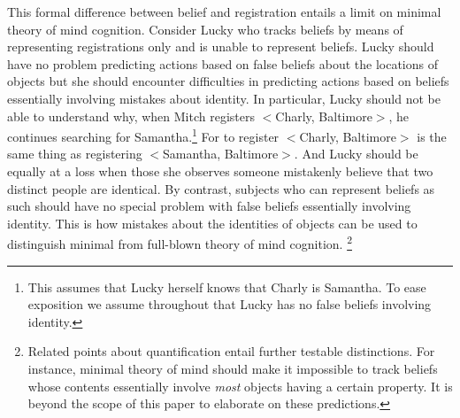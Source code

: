 \documentclass[12pt,\papersize]{extarticle}
\begin{document}
This formal difference between belief and registration entails a limit on minimal theory of mind cognition.  Consider Lucky who tracks beliefs by means of representing registrations only and is unable to represent beliefs. Lucky should have no problem predicting actions based on false beliefs about the locations of objects but she should encounter difficulties in predicting actions based on beliefs essentially involving mistakes about identity.  In particular, Lucky should not be able to understand why, when Mitch registers \(<\)Charly, Baltimore\(>\), he continues searching for Samantha.\footnote{ 	This assumes that Lucky herself knows that Charly is Samantha.  To ease exposition we assume throughout that Lucky has no false beliefs involving identity.}  For to register \(<\)Charly, Baltimore\(>\) is the same thing as registering \(<\)Samantha, Baltimore\(>\). And Lucky should be equally at a loss when those she observes someone mistakenly believe that two distinct people are identical.  By contrast, subjects who can represent beliefs as such should have no special problem with false beliefs essentially involving identity.  This is how mistakes about the identities of objects can be used to distinguish minimal from full-blown theory of mind cognition.%
\footnote{ 	
Related points about quantification entail further testable distinctions.  For instance, minimal theory of mind should make it impossible to track beliefs whose contents essentially involve \textit{most} objects having a certain property.  It is beyond the scope of this paper to elaborate on these predictions.
}
\end{document}
